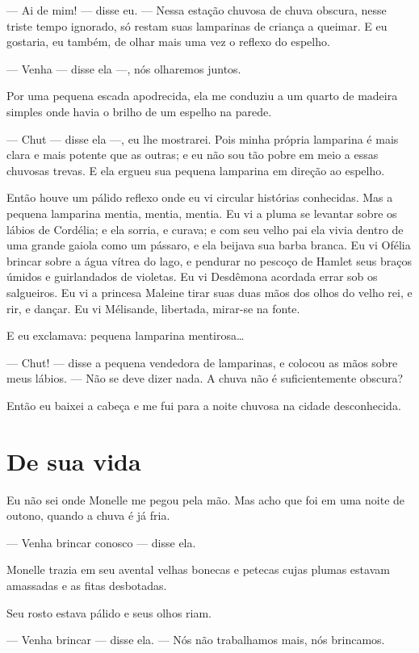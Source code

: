 --- Ai de mim! --- disse eu. --- Nessa estação chuvosa de chuva obscura, nesse
triste tempo ignorado, só restam suas lamparinas de criança a queimar. E eu
gostaria, eu também, de olhar mais uma vez o reflexo do espelho.

--- Venha --- disse ela ---, nós olharemos juntos.

Por uma pequena escada apodrecida, ela me \mbox{conduziu} a um quarto de
madeira simples onde havia o brilho de um espelho na parede.

--- Chut --- disse ela ---, eu lhe mostrarei. Pois minha própria lamparina é
mais clara e mais potente que as outras; e eu não sou tão pobre em meio a
essas chuvosas trevas. E ela ergueu sua pequena lamparina em direção ao
espelho.

Então houve um pálido reflexo onde eu vi circular histórias conhecidas.
Mas a pequena lamparina mentia, mentia, mentia. Eu vi a pluma se levantar
sobre os lábios de Cordélia; e ela sorria, e curava; e com seu velho pai
ela vivia dentro de uma grande gaiola como um pássaro, e ela beijava sua
barba branca. Eu vi Ofélia brincar sobre a água vítrea do lago, e pendurar
no pescoço de Hamlet seus braços úmidos e guirlandados de violetas. Eu vi
Desdêmona acordada errar sob os salgueiros. Eu vi a princesa Maleine tirar
suas duas mãos dos olhos do velho rei, e rir, e dançar. Eu vi Mélisande,
libertada, mirar-se na fonte.

E eu exclamava: pequena lamparina mentirosa\ldots{}

--- Chut! --- disse a pequena vendedora de lamparinas, e colocou as mãos
sobre meus lábios.  --- Não se deve dizer nada. A chuva não é suficientemente
obscura?

Então eu baixei a cabeça e me fui para a noite chuvosa na cidade
desconhecida.

\section*{De sua vida}

Eu não sei onde Monelle me pegou pela mão. Mas acho que foi em uma
noite de outono, quando a chuva é já fria.

--- Venha brincar conosco --- disse ela.

Monelle trazia em seu avental velhas bonecas e petecas cujas plumas
estavam amassadas e as fitas desbotadas.

Seu rosto estava pálido e seus olhos riam.

--- Venha brincar --- disse ela.  --- Nós não trabalhamos mais, nós brincamos.

